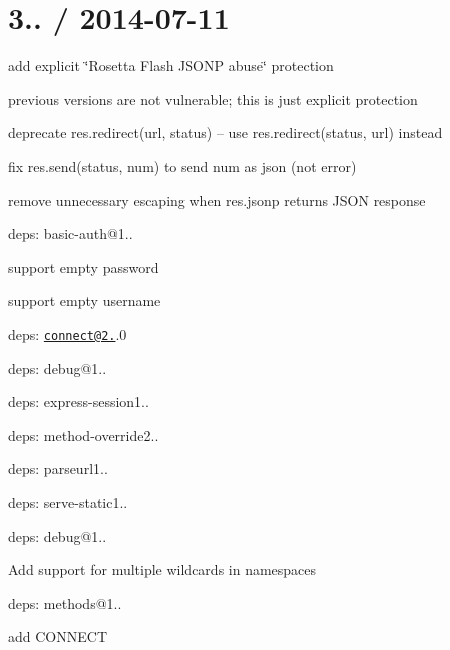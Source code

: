 {\ttfamily \section*{3.. / 2014-\/07-\/11 }}

{\ttfamily }

{\ttfamily 
\begin{DoxyItemize}
\item add explicit \char`\"{}\+Rosetta Flash J\+S\+O\+N\+P abuse\char`\"{} protection
\begin{DoxyItemize}
\item previous versions are not vulnerable; this is just explicit protection
\end{DoxyItemize}
\item deprecate {\ttfamily res.\+redirect(url, status)} -- use {\ttfamily res.\+redirect(status, url)} instead
\item fix {\ttfamily res.\+send(status, num)} to send {\ttfamily num} as json (not error)
\item remove unnecessary escaping when {\ttfamily res.\+jsonp} returns J\+S\+ON response
\item deps\+: basic-\/auth@1..
\begin{DoxyItemize}
\item support empty password
\item support empty username
\end{DoxyItemize}
\item deps\+: \href{mailto:connect@2.23}{\tt connect@2.}.0
\begin{DoxyItemize}
\item deps\+: debug@1..
\item deps\+: express-\/session1..
\item deps\+: method-\/override2..
\item deps\+: parseurl1..
\item deps\+: serve-\/static1..
\end{DoxyItemize}
\end{DoxyItemize}}

{\ttfamily deps\+: debug@1..
\begin{DoxyItemize}
\item Add support for multiple wildcards in namespaces
\end{DoxyItemize}}

{\ttfamily deps\+: methods@1..
\begin{DoxyItemize}
\item add {\ttfamily C\+O\+N\+N\+E\+CT}
\end{DoxyItemize}}

